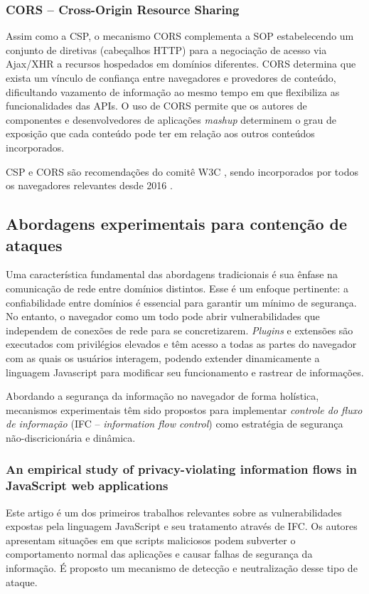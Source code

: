 \subsubsection{CORS -- Cross-Origin Resource Sharing}
Assim como a CSP, o mecanismo CORS \cite{W3C:CORS} complementa a SOP estabelecendo um conjunto de diretivas (cabeçalhos HTTP) para a negociação de acesso via Ajax/XHR a recursos hospedados em domínios diferentes. CORS determina que exista um vínculo de confiança entre navegadores e provedores de conteúdo, dificultando vazamento de informação ao mesmo tempo em que flexibiliza as funcionalidades das APIs. O uso de CORS permite que os autores de componentes e desenvolvedores de aplicações \textit{mashup} determinem o grau de exposição que cada conteúdo pode ter em relação aos outros conteúdos incorporados.

CSP e CORS são recomendações do comitê W3C \cite{W3C:CSP} \cite{W3C:CORS}, sendo incorporados por todos os navegadores relevantes desde 2016 \cite{CanIUse:CSP} \cite{CanIUse:CORS}.


\subsection{Abordagens experimentais para contenção de ataques}

Uma característica fundamental das abordagens tradicionais é sua ênfase na comunicação de rede entre domínios distintos. Esse é um enfoque pertinente: a confiabilidade entre domínios é essencial para garantir um mínimo de segurança. No entanto, o navegador como um todo pode abrir vulnerabilidades que independem de conexões de rede para se concretizarem. \textit{Plugins} e extensões são executados com privilégios elevados e têm acesso a todas as partes do navegador com as quais os usuários interagem, podendo extender dinamicamente a linguagem Javascript para modificar seu funcionamento e rastrear de informações.

Abordando a segurança da informação no navegador de forma holística, mecanismos experimentais têm sido propostos para implementar \textit{controle do fluxo de informação} (IFC -- \textit{information flow control}) como estratégia de segurança não-discricionária e dinâmica.


\subsubsection{An empirical study of privacy-violating information flows in JavaScript web applications \cite{Jang2010}}
Este artigo é um dos primeiros trabalhos relevantes sobre as vulnerabilidades expostas pela linguagem JavaScript e seu tratamento através de IFC. Os autores apresentam situações em que scripts maliciosos podem subverter o comportamento normal das aplicações e causar falhas de segurança da informação. É proposto um mecanismo de detecção e neutralização desse tipo de ataque.

